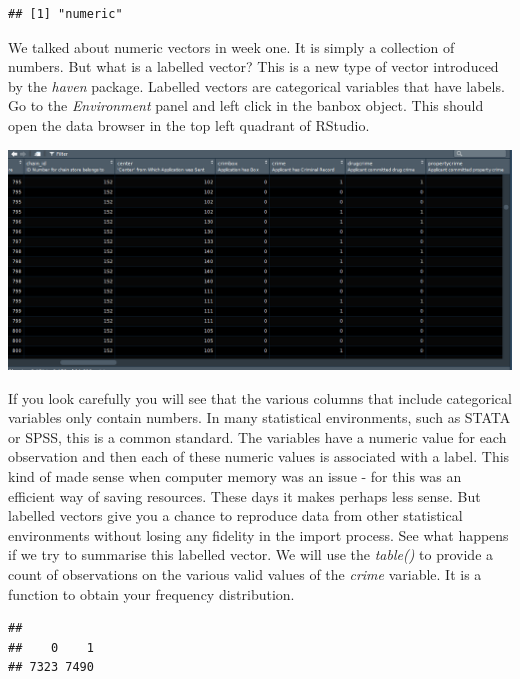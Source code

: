 \documentclass[]{book}
\newenvironment{Shaded}{\begin{snugshade}}{\end{snugshade}}
\newcommand{\KeywordTok}[1]{\textcolor[rgb]{0.13,0.29,0.53}{\textbf{#1}}}
\newcommand{\NormalTok}[1]{#1}
\newcommand{\OperatorTok}[1]{\textcolor[rgb]{0.81,0.36,0.00}{\textbf{#1}}}
\theoremstyle{definition}
\theoremstyle{definition}
\theoremstyle{definition}
\theoremstyle{remark}
\begin{document}
\begin{verbatim}
## [1] "numeric"
\end{verbatim}

We talked about numeric vectors in week one. It is simply a collection
of numbers. But what is a labelled vector? This is a new type of vector
introduced by the \emph{haven} package. Labelled vectors are categorical
variables that have labels. Go to the \emph{Environment} panel and left
click in the banbox object. This should open the data browser in the top
left quadrant of RStudio.

\includegraphics{imgs/dataview_causality.png}

If you look carefully you will see that the various columns that include
categorical variables only contain numbers. In many statistical
environments, such as STATA or SPSS, this is a common standard. The
variables have a numeric value for each observation and then each of
these numeric values is associated with a label. This kind of made sense
when computer memory was an issue - for this was an efficient way of
saving resources. These days it makes perhaps less sense. But labelled
vectors give you a chance to reproduce data from other statistical
environments without losing any fidelity in the import process. See what
happens if we try to summarise this labelled vector. We will use the
\emph{table()} to provide a count of observations on the various valid
values of the \emph{crime} variable. It is a function to obtain your
frequency distribution.

\begin{Shaded}
\end{Shaded}

\begin{verbatim}
## 
##    0    1 
## 7323 7490
\end{verbatim}
\end{document}
